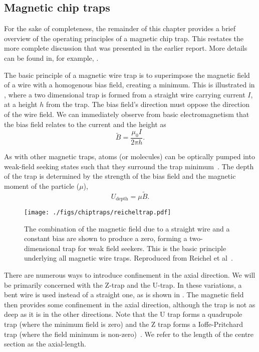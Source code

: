 \subsection*{Magnetic chip traps}

For the sake of completeness, the remainder of this chapter provides a brief
overview of the operating principles of a magnetic chip trap. This restates the
more complete discussion that was presented in the earlier report. More details
can be found in, for example, .

The basic principle of a magnetic wire trap is to superimpose the magnetic
field of a wire with a homogenous bias field, creating a minimum. This is
illustrated in , where a two dimensional
trap is formed from a straight wire carrying current $I$, at a height $h$ from
the trap. 
The bias field's direction must oppose the
direction of the wire field. We can immediately observe from basic
electromagnetism that the bias field relates to the current and the height
as~\cite{Reichel1999}
%
\begin{equation}
  \tilde{B} = \frac{\mu_0 I}{2\pi h}.
  \label{intro:eq:trapbias}
\end{equation}

As with other magnetic traps, atoms (or molecules) can be optically pumped into
weak-field seeking states such that they surround
the trap minimum~\cite{Metcalf1999}. The depth of the trap is determined by the
strength of the bias field and the magnetic moment of the particle ($\mu$),
%
\begin{equation}
  U_\text{depth} = \mu \tilde{B}. 
  \label{intro:eq:trapdepth}
\end{equation}

\begin{figure}
  \centering
  \texttt{[image: ./figs/chiptraps/reicheltrap.pdf]}
  \caption{The combination of the magnetic field due to a straight wire and a
  constant bias are shown to produce a zero, forming a two-dimensional trap for
  weak field seekers. This is the basic principle underlying all magnetic wire
  traps. Reproduced from Reichel et al~\cite{Reichel1999}.
  }
  \label{intro:fig:reicheltrap}
\end{figure}

There are numerous ways to introduce confinement in the axial direction. We
will be primarily concerned with the Z-trap and the U-trap. In these variations,
a bent wire is used instead of a straight one, as is shown in
. The magnetic field then provides some confinement in the
axial direction, although the trap is not as deep as it is in the other
directions. Note that the U trap forms a quadrupole trap (where the minimum
field is zero) and the Z trap forms a Ioffe-Pritchard trap (where the field
minimum is non-zero)~\cite{2011Ac}. We refer to the length of the centre section as
the axial-length.

